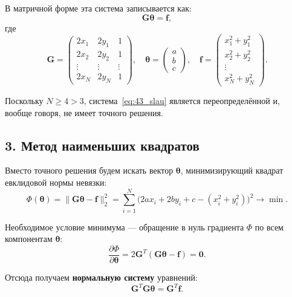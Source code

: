 \documentclass{article}
\begin{document}
В матричной форме эта система записывается как:
\begin{equation}
\mathbf{G} \boldsymbol{\theta} = \mathbf{f},
\label{eq:43_slau}
\end{equation}
где
\begin{equation}
\mathbf{G} =
\begin{pmatrix}
2x_1 & 2y_1 & 1 \\
2x_2 & 2y_2 & 1 \\
\vdots & \vdots & \vdots \\
2x_N & 2y_N & 1
\end{pmatrix}, \quad
\boldsymbol{\theta} =
\begin{pmatrix}
a \\ b \\ c
\end{pmatrix}, \quad
\mathbf{f} =
\begin{pmatrix}
x_1^2 + y_1^2 \\
x_2^2 + y_2^2 \\
\vdots \\
x_N^2 + y_N^2
\end{pmatrix}.
\end{equation}

Поскольку $N \geqslant 4 > 3$, система~\eqref{eq:43_slau} является переопределённой и, вообще говоря, не имеет точного решения.

\subsection*{3. Метод наименьших квадратов}

Вместо точного решения будем искать вектор $\boldsymbol{\theta}$, минимизирующий квадрат евклидовой нормы невязки:
\begin{equation}
\Phi(\boldsymbol{\theta}) = \|\mathbf{G}\boldsymbol{\theta} - \mathbf{f}\|_2^2 = \sum_{i=1}^{N} \bigl(2a x_i + 2b y_i + c - (x_i^2 + y_i^2)\bigr)^2 \to \min.
\end{equation}

Необходимое условие минимума --- обращение в нуль градиента $\Phi$ по всем компонентам $\boldsymbol{\theta}$:
\begin{equation}
\frac{\partial \Phi}{\partial \boldsymbol{\theta}} = 2\mathbf{G}^T(\mathbf{G}\boldsymbol{\theta} - \mathbf{f}) = \mathbf{0}.
\end{equation}

Отсюда получаем \textbf{нормальную систему} уравнений:
\begin{equation}
\mathbf{G}^T \mathbf{G} \boldsymbol{\theta} = \mathbf{G}^T \mathbf{f}.
\label{eq:43_normal}
\end{equation}
\end{document}
